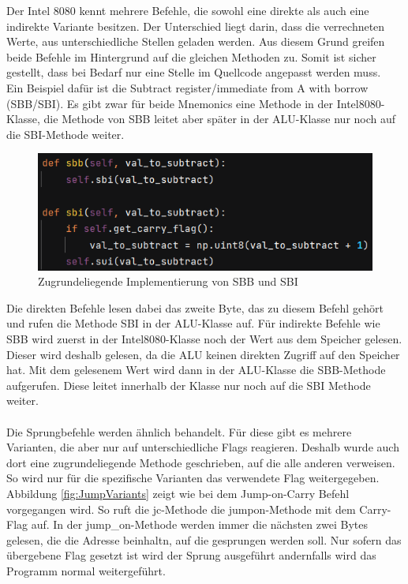 \documentclass[12pt]{article}
\newcommand{\imgSpaceBefore}{\vspace{10pt}}
\begin{document}
Der Intel 8080 kennt mehrere Befehle, die sowohl eine direkte als auch eine indirekte Variante besitzen. Der Unterschied liegt darin, dass die verrechneten Werte, aus unterschiedliche Stellen geladen werden. Aus diesem Grund greifen beide Befehle im Hintergrund auf die gleichen Methoden zu. Somit ist sicher gestellt, dass bei Bedarf nur eine Stelle im Quellcode angepasst werden muss.
\\
Ein Beispiel dafür ist die \glqq Subtract register/immediate from A with borrow (SBB/SBI)\grqq. Es gibt zwar für beide Mnemonics eine Methode in der Intel8080-Klasse, die Methode von SBB leitet aber später in der ALU-Klasse nur noch auf die SBI-Methode weiter.

\imgSpaceBefore
\begin{figure}[h]
\centering
\includegraphics[width=15cm]{Bilder/DoubleUsedMethodSubtract}
\caption{Zugrundeliegende Implementierung von SBB und SBI}
\label{fig:DoubleUsedMethodSubtract}
\end{figure}

\noindent
Die direkten Befehle lesen dabei das zweite Byte, das zu diesem Befehl gehört und rufen die
Methode SBI in der ALU-Klasse auf. Für indirekte Befehle wie SBB wird zuerst in der Intel8080-Klasse noch der Wert aus dem Speicher gelesen. Dieser wird deshalb gelesen, da die ALU keinen direkten Zugriff auf den Speicher hat. Mit dem gelesenem Wert wird dann in der ALU-Klasse die SBB-Methode aufgerufen. Diese leitet innerhalb der Klasse nur noch auf die SBI Methode weiter.
\\\\
Die Sprungbefehle werden ähnlich behandelt. Für diese gibt es mehrere Varianten, die aber nur auf unterschiedliche Flags reagieren. Deshalb wurde auch dort eine zugrundeliegende Methode geschrieben, auf die alle anderen verweisen. So wird nur für die spezifische Varianten das verwendete Flag weitergegeben.  Abbildung \ref{fig:JumpVariants} zeigt wie bei dem Jump-on-Carry Befehl vorgegangen wird. So ruft die jc-Methode die jump\-on-Methode mit dem Carry-Flag auf. In der jump\_on-Methode werden immer die nächsten zwei Bytes gelesen, die die Adresse beinhaltn, auf die gesprungen werden soll. Nur sofern das übergebene Flag gesetzt ist wird der Sprung ausgeführt andernfalls wird das Programm normal weitergeführt.
\end{document}

